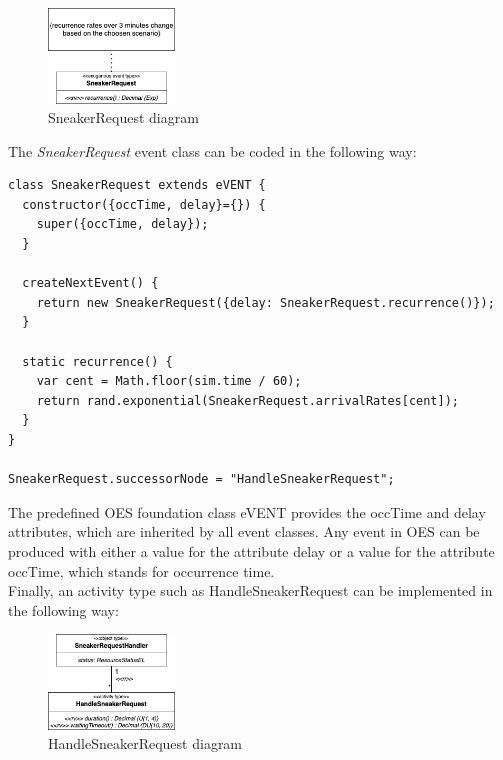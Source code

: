 \documentclass{article}
\begin{document}
\begin{figure}[h]
    \centering
    \includegraphics[width=0.3\textwidth]{SneakerRequest}
    \caption{SneakerRequest diagram}
\end{figure}

\FloatBarrier

The {\em SneakerRequest} event class can be coded in the following way:

\medskip
\begin{lstlisting}[caption=SneakerRequestHandler]
class SneakerRequest extends eVENT {
  constructor({occTime, delay}={}) {
    super({occTime, delay});
  }

  createNextEvent() {
    return new SneakerRequest({delay: SneakerRequest.recurrence()});
  }

  static recurrence() {
    var cent = Math.floor(sim.time / 60);
    return rand.exponential(SneakerRequest.arrivalRates[cent]);
  }
}

SneakerRequest.successorNode = "HandleSneakerRequest";

\end{lstlisting}

The predefined OES foundation class eVENT provides the occTime and delay attributes, which are inherited by all event classes. Any event in OES can be produced with either a value for the attribute delay or a value for the attribute occTime, which stands for occurrence time. \\
Finally, an activity type such as HandleSneakerRequest can be implemented in the following way:

\begin{figure}[h]
    \centering
    \includegraphics[width=0.3\textwidth]{RequestHandler}
    \caption{HandleSneakerRequest diagram}
\end{figure}

\FloatBarrier
\end{document}

